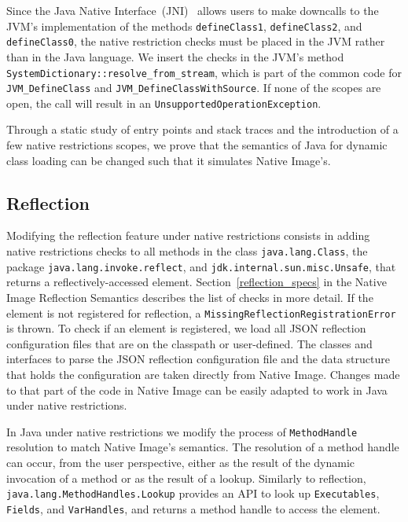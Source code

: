 Since the Java Native Interface~(JNI)~\cite{noauthor_jni_nodate} allows users to make downcalls to the JVM's implementation of the methods \verb|defineClass1|, \verb|defineClass2|, and \verb|defineClass0|, the native restriction checks must be placed in the JVM rather than in the Java language. We insert the checks in the JVM's method \verb|SystemDictionary::resolve_from_stream|, which is part of the common code for \verb|JVM_DefineClass| and \verb|JVM_DefineClassWithSource|. If none of the scopes are open, the call will result in an \verb|UnsupportedOperationException|. 

Through a static study of entry points and stack traces and the introduction of a few native restrictions scopes, we prove that the semantics of Java for dynamic class loading can be changed such that it simulates Native Image's.

\subsection{Reflection}
Modifying the reflection feature under native restrictions consists in adding native restrictions checks to all methods in the class \verb|java.lang.Class|, the package \verb|java.lang.invoke.reflect|, and \verb|jdk.internal.sun.misc.Unsafe|, that returns a reflectively-accessed element. Section~\ref{reflection_specs} in the Native Image Reflection Semantics describes the list of checks in more detail. 
If the element is not registered for reflection, a \verb|MissingReflectionRegistrationError| is thrown.
To check if an element is registered, we load all JSON reflection configuration files that are on the classpath or user-defined. The classes and interfaces to parse the JSON reflection configuration file and the data structure that holds the configuration are taken directly from Native Image. Changes made to that part of the code in Native Image can be easily adapted to work in Java under native restrictions.

In Java under native restrictions we modify the process of \verb|MethodHandle| resolution to match Native Image's semantics.
The resolution of a method handle can occur, from the user perspective, either as the result of the dynamic invocation of a method or as the result of a lookup.
Similarly to reflection, \verb|java.lang.MethodHandles.Lookup| provides an API to look up \verb|Executables|, \verb|Fields|, and \verb|VarHandles|, and returns a method handle to access the element. 

